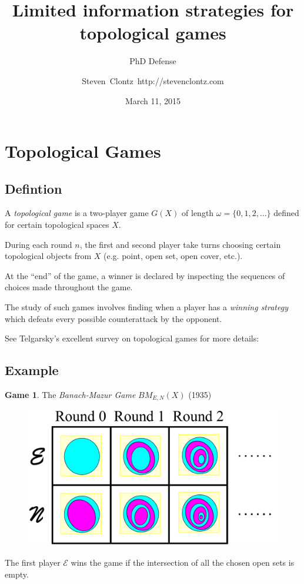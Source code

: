 \documentclass{beamer}
\title
{Limited information strategies for topological games}
\subtitle
{PhD Defense} %
\author%
{Steven~Clontz~http://stevenclontz.com}%
\institute[Auburn University] %
{
  Department of Mathematics and Statistics\\
  Auburn University}
\date[15-03-11] %
{March 11, 2015}
\theoremstyle{definition}
\newtheorem{game}[theorem]{Game}
\newcommand{\<}{\langle}
\renewcommand{\>}{\rangle}
\newcommand{\pl}[1]{\mathscr{#1}}
\newcommand{\term}{\textit}
\newcommand{\bmGame}[1]{{BM}_{E,N}(#1)}
\begin{document}
\newcommand{\vspacing}{\vspace{1em}}
\newcommand{\vpause}{\pause\vspacing}

\begin{frame}
  \titlepage
\end{frame}

\section{Topological Games}

\subsection{Defintion}

\begin{frame}
  A \term{topological game} is a two-player game $G(X)$ of length
  $\omega=\{0,1,2,\dots\}$ defined for certain topological spaces $X$.

  \vpause

  During each round $n$, the first and second player take turns choosing
  certain topological objects from $X$ (e.g. point, open set, open cover, etc.).

  \vpause

  At the ``end'' of the game, a winner is declared by inspecting the sequences
  of choices made throughout the game.

  \vpause

  The study of such games involves finding when a player has a
  \term{winning strategy} which defeats every possible counterattack by
  the opponent.

  \vpause

  {\tiny See Telgarsky's excellent survey on topological games for more
  details: \cite{MR892457}}
\end{frame}

\subsection{Example}

\begin{frame}
  \small
  \begin{game}
    The \term{Banach-Mazur Game}
    $\bmGame{X}$ (1935) \cite{MR666400}

    \begin{figure}
      \includegraphics[width=0.6\linewidth]{bmGameAlt.pdf}
    \end{figure}

  The first player $\pl E$ wins the game if the intersection of all the chosen
  open sets is empty.
  \end{game}
\end{frame}
\end{document}
